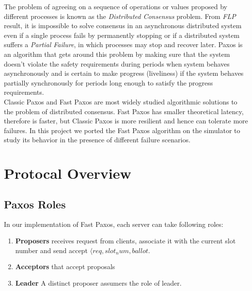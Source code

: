 The problem of agreeing on a sequence of operations or values proposed by different processes is known as the \textit{Distributed Consensus} problem. From \textit{FLP} result\cite{flpresult}, it is impossible to solve consensus in an asynchronous distributed system even if a single process fails by permanently stopping or if a distributed system suffers a \textit{Partial Failure}, in which processes may stop and recover later. Paxos is an algorithm that gets around this problem by making sure that the system doesn't violate the safety requirements during periods when system behaves asynchronously and is certain to make progress (liveliness) if the system behaves partially synchronously for periods long enough to satisfy the progress requirements.\\

\noindent Classic Paxos and Fast Paxos are most widely studied algorithmic solutions to the problem of distributed consensus. Fast Paxos has smaller theoretical latency, therefore is faster, but Classic Paxos is more resilient and hence can tolerate more failures.
In this project we ported the Fast Paxos algorithm on the simulator to study its behavior in the presence of different failure scenarios. 

\section{Protocal Overview}
\label{sec:examples}

\subsection{Paxos Roles}
In our implementation of Fast Paxos, each server can take following roles:

\begin{enumerate}
\item {\textbf{Proposers} receives request from clients, associate it with the current slot number and send accept $\langle req, slot_num, ballot$\rangle.}

\item {\textbf{Acceptors} that accept proposals}
\item {\textbf{Leader} A distinct proposer assumers the role of leader.}
\end{enumerate}


